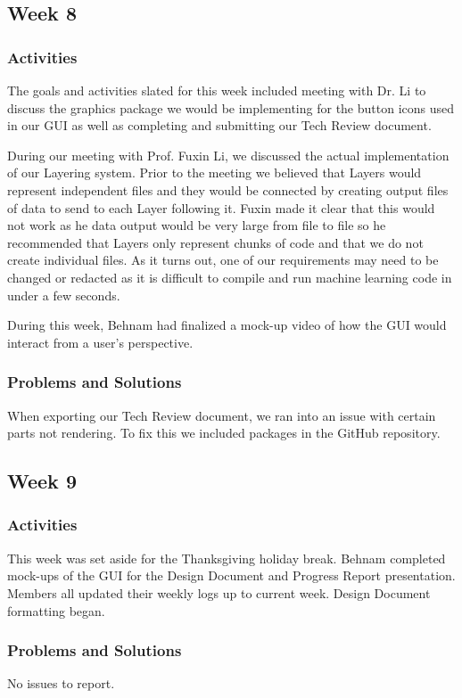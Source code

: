 \documentclass[journal,10pt,onecolumn,compsoc]{IEEEtran} \usepackage[margin=1.0in]{geometry} \usepackage{pdfpages}
\begin{document}
\subsection{Week 8}
\subsubsection{Activities}
The goals and activities slated for this week included meeting with Dr. Li to discuss the graphics package we would be implementing for the button icons used in our GUI as well as completing and submitting our Tech Review document.

\noindent During our meeting with Prof. Fuxin Li, we discussed the actual implementation of our Layering system. 
Prior to the meeting we believed that Layers would represent independent files and they would be connected by creating output files of data to send to each Layer following it.
Fuxin made it clear that this would not work as he data output would be very large from file to file so he recommended that Layers only represent chunks of code and that we do not create individual files.
As it turns out, one of our requirements may need to be changed or redacted as it is difficult to compile and run machine learning code in under a few seconds.

\noindent During this week, Behnam had finalized a mock-up video of how the GUI would interact from a user's perspective.
\subsubsection{Problems and Solutions}
When exporting our Tech Review document, we ran into an issue with certain parts not rendering.
To fix this we included packages in the GitHub repository.
\subsection{Week 9}
\subsubsection{Activities}
This week was set aside for the Thanksgiving holiday break.
Behnam completed mock-ups of the GUI for the Design Document and Progress Report presentation.
Members all updated their weekly logs up to current week.
Design Document formatting began.

\subsubsection{Problems and Solutions}
No issues to report.
\end{document}
